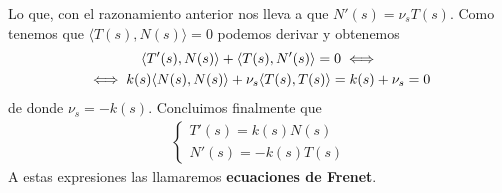 \begin{propiedades}
\begin{enumerate}
        Lo que, con el razonamiento anterior nos lleva a que $N'(s)=\nu_s T(s)$. Como tenemos que $\langle T(s), N(s) \rangle = 0$ podemos derivar y obtenemos 
        \begin{gather*}
            \langle T'(s), N(s)\rangle + \langle T(s), N'(s)\rangle = 0 \iff\\
            \iff k(s) \langle N(s), N(s) \rangle + \nu_s \langle T(s), T(s) \rangle = k(s) + \nu_s = 0
        \end{gather*}
        de donde $\nu_s = -k(s)$. Concluimos finalmente que 
        \begin{gather*}
            \left\{
                \begin{array}{c}
                    T'(s) = k(s)N(s)\\
                    N'(s) = -k(s)T(s)
                \end{array}
            \right.
        \end{gather*}
        A estas expresiones las llamaremos \textbf{ecuaciones de Frenet}.
    \end{enumerate}
\end{propiedades}

